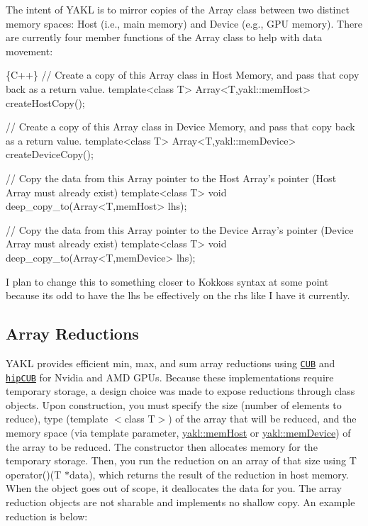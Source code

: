 The intent of Y\+A\+KL is to mirror copies of the {\ttfamily Array} class between two distinct memory spaces\+: Host (i.\+e., main memory) and Device (e.\+g., G\+PU memory). There are currently four member functions of the {\ttfamily Array} class to help with data movement\+:


\begin{DoxyCode}
\{C++\}
// Create a copy of this Array class in Host Memory, and pass that copy back as a return value.
template<class T> Array<T,yakl::memHost> createHostCopy();

// Create a copy of this Array class in Device Memory, and pass that copy back as a return value.
template<class T> Array<T,yakl::memDevice> createDeviceCopy();

// Copy the data from this Array pointer to the Host Array's pointer (Host Array must already exist)
template<class T> void deep\_copy\_to(Array<T,memHost> lhs);

// Copy the data from this Array pointer to the Device Array's pointer (Device Array must already exist)
template<class T> void deep\_copy\_to(Array<T,memDevice> lhs);
\end{DoxyCode}


I plan to change this to something closer to Kokkos\textquotesingle{}s syntax at some point because it\textquotesingle{}s odd to have the lhs be effectively on the rhs like I have it currently.

\subsection*{Array Reductions}

Y\+A\+KL provides efficient min, max, and sum array reductions using \href{https://nvlabs.github.io/cub/}{\tt C\+UB} and \href{https://github.com/ROCmSoftwarePlatform/hipCUB}{\tt hip\+C\+UB} for Nvidia and A\+MD G\+P\+Us. Because these implementations require temporary storage, a design choice was made to expose reductions through class objects. Upon construction, you must specify the size (number of elements to reduce), type ({\ttfamily template $<$class T$>$}) of the array that will be reduced, and the memory space (via template parameter, {\ttfamily \hyperlink{namespaceyakl_aae8a8c910fec7cef7db68c9658c16405}{yakl\+::mem\+Host}} or {\ttfamily \hyperlink{namespaceyakl_ac3c32aec58c61e7f870081477ceee883}{yakl\+::mem\+Device}}) of the array to be reduced. The constructor then allocates memory for the temporary storage. Then, you run the reduction on an array of that size using {\ttfamily T operator()(\+T $\ast$data)}, which returns the result of the reduction in host memory. When the object goes out of scope, it deallocates the data for you. The array reduction objects are not sharable and implements no shallow copy. An example reduction is below\+:


